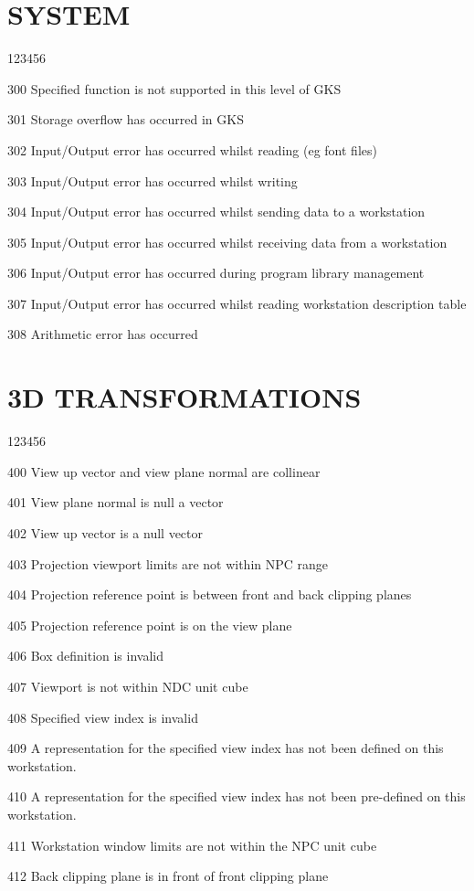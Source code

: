 \section{SYSTEM}
\begin{DLtt}{123456}
\item[300]
Specified function is not supported in this level of GKS
\item[301]
Storage overflow has occurred in GKS
\item[302]
Input/Output error has occurred whilst reading (eg font files)
\item[303]
Input/Output error has occurred whilst writing
\item[304]
Input/Output error has occurred whilst sending data to a workstation
\item[305]
Input/Output error has occurred whilst receiving data from a workstation
\item[306]
Input/Output error has occurred during program library management
\item[307]
Input/Output error has occurred whilst reading workstation
description table
\item[308]
Arithmetic error has occurred
\end{DLtt}
\section{3D TRANSFORMATIONS}
\begin{DLtt}{123456}
\item[400]
View up vector and view plane normal are collinear
\item[401]
View plane normal is null a vector
\item[402]
View up vector is a null vector
\item[403]
Projection viewport limits are not within NPC range
\item[404]
Projection reference point is between front and back clipping planes
\item[405]
Projection reference point is on the view plane
\item[406]
Box definition is invalid
\item[407]
Viewport is not within NDC unit cube
\item[408]
Specified view index is invalid
\item[409]
A representation for the specified view index has not been defined
on this workstation.
\item[410]
A representation for the specified view index has not been pre-defined
on this workstation.
\item[411]
Workstation window limits are not within the NPC unit cube
\item[412]
Back clipping plane is in front of front clipping plane
\end{DLtt}
